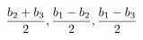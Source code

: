 \documentclass[preview]{standalone}
\begin{document}
\begin{align*}
\special{dvisvgm:raw <g id='unique000'>}\frac{b_2+b_3}{2},\frac{b_1-b_2}{2},\frac{b_1-b_3}{2}\special{dvisvgm:raw </g>}
\end{align*}
\end{document}
